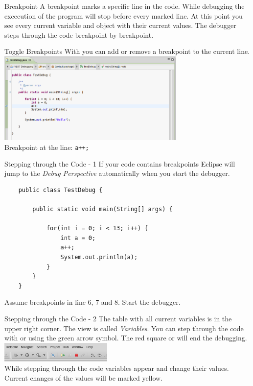 \begin{frame}{Breakpoint}
	A breakpoint marks a specific line in the code.
	\vfill
	While debugging the excecution of the program will stop before every marked line.
	At this point you see every current variable and object with their current values.
	\vfill
	The debugger steps through the code breakpoint by breakpoint.
\end{frame}

\begin{frame}{Toggle Breakpoints}
	With  you can add or remove a breakpoint to the current line.
	\vfill
	\includegraphics[width=25em]{res/debug_breakpoint.png} \\
	Breakpoint at the line: \texttt{a++;}
\end{frame}

\begin{frame}[fragile]{Stepping through the Code - 1}
	If your code contains breakpoints Eclipse will jump to the \emph{Debug Perspective} automatically
	when you start the debugger.
	\begin{lstlisting}
	public class TestDebug {

	    public static void main(String[] args) {
		
	        for(int i = 0; i < 13; i++) {
	            int a = 0;
	            a++;
	            System.out.println(a);
	        }
	    }
	}
	\end{lstlisting}
	Assume breakpoints in line 6, 7 and 8. Start the debugger.
\end{frame}

\begin{frame}{Stepping through the Code - 2}
	The table with all current variables is in the upper right corner.
	The view is called \emph{Variables}.
	\vfill
	You can step through the code with  or using the green arrow symbol. 
	The red square or  will end the debugging.\\
	\includegraphics[width=15em]{res/debug_step.png} \\
	\vfill
	While stepping through the code variables appear and change their values.
	Current changes of the values will be marked yellow.
\end{frame}

